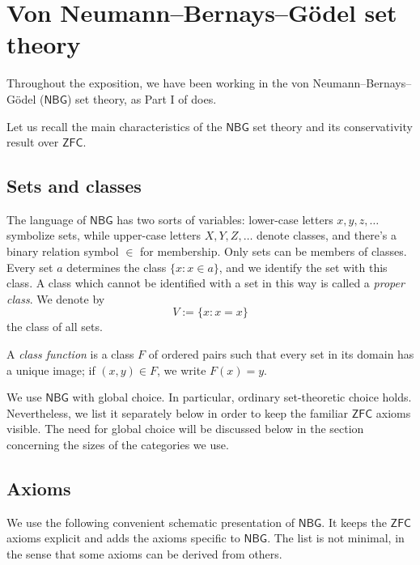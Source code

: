 \chapter{Von Neumann--Bernays--Gödel set theory}
Throughout the exposition, we have been working in the von Neumann--Bernays--Gödel ($\mathsf{NBG}$) set theory, as Part I of \cite{LambekScott1994} does.

Let us recall the main characteristics of the $\mathsf{NBG}$ set theory and its conservativity result over $\mathsf{ZFC}$.

\section{Sets and classes}
The language of $\mathsf{NBG}$ has two sorts of variables: lower-case letters $x,y,z,\ldots$ symbolize sets, while upper-case letters $X,Y,Z,\ldots$ denote classes, and there's a binary relation symbol $\in$ for membership.
Only sets can be members of classes. Every set $a$ determines the class $\{x : x\in a\}$, and we identify the set with this class. A class which cannot be identified with a set in this way is called a \emph{proper class}.
We denote by
\[ V := \{x : x = x\} \]
the class of all sets.

A \emph{class function} is a class $F$ of ordered pairs such that every set in its domain has a unique image; if $(x,y)\in F$, we write $F(x) = y$.

We use $\mathsf{NBG}$ with global choice. In particular, ordinary set-theoretic choice holds. Nevertheless, we list it separately below in order to keep the familiar $\mathsf{ZFC}$ axioms visible.
The need for global choice will be discussed below in the section concerning the sizes of the categories we use.

\section{Axioms}
We use the following convenient schematic presentation of $\mathsf{NBG}$. It keeps the $\mathsf{ZFC}$ axioms explicit and adds the axioms specific to $\mathsf{NBG}$.
The list is not minimal, in the sense that some axioms can be derived from others.

